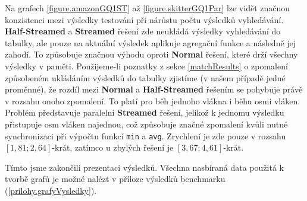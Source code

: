 Na grafech \ref{figure.amazonGQ1ST} až \ref{figure.skitterGQ1Par} lze vidět značnou konzistenci mezi výsledky testování při nárůstu počtu výsledků vyhledávání.
\textbf{Half-Streamed} a \textbf{Streamed} řešení zde neukládá výsledky vyhledávání do tabulky, ale pouze na aktuální výsledek aplikuje agregační funkce a následně jej zahodí.
To způsobuje značnou výhodu oproti \textbf{Normal} řešení, které drží všechny výsledky v paměti.
Použijeme-li poznatky z sekce \ref{matchResults} o zpomalení způsobeném ukládáním výsledků do tabulky zjistíme (v našem případě jedné proměnné), že rozdíl mezi \textbf{Normal} a \textbf{Half-Streamed} řešením se pohybuje právě v rozsahu onoho zpomalení.
To platí pro běh jednoho vlákna i běhu osmi vláken. 
Problém představuje paralelní \textbf{Streamed} řešení, jelikož k jednomu výsledku přistupuje osm vláken najednou, což způsobuje značné zpomalení kvůli nutné synchronizaci při výpočtu funkcí \verb+min+ a \verb+avg+. 
Zrychlení je zde pouze v rozsahu $[1,81; 2,64]$-krát, zatímco u zbylých řešení je $[3,67; 4,61]$-krát.

Tímto jsme zakončili prezentaci výsledků. 
Všechna nasbíraná data použitá k tvorbě grafů je možné nalézt v příloze výsledků benchmarku (\ref{prilohy.grafyVysledky}). 

